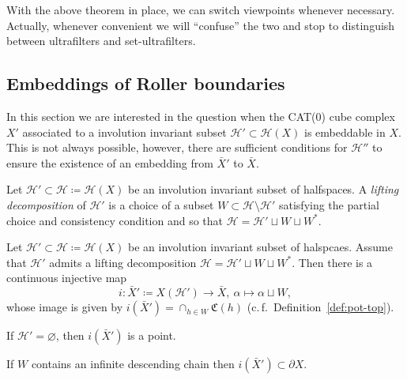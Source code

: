 With the above theorem in place, we can switch viewpoints whenever necessary. Actually, whenever convenient we will \enquote{confuse} the two and stop to distinguish between ultrafilters and set-ultrafilters.

\subsection{Embeddings of Roller boundaries}
\label{sec:embedding-roller}

In this section we are interested in the question when the CAT(0) cube complex \(X'\) associated to a involution invariant subset \(\mathcal{H}' \subset \mathcal{H}(X)\) is embeddable in \(X\). This is not always possible, however, there are sufficient conditions for \(\mathcal{H}''\) to ensure the existence of an embedding from \(\bar X'\) to \(\bar X\).

\begin{defin}
  Let \(\mathcal{H}' \subset \mathcal{H} \coloneqq \mathcal{H}(X)\) be an involution invariant subset of halfspaces. A \emph{lifting decomposition} of \(\mathcal{H}'\) is a choice of a subset \(W \subset \mathcal{H} \setminus \mathcal{H}'\) satisfying the partial choice and consistency condition and so that \(\mathcal{H} = \mathcal{H}' \sqcup W \sqcup W^\ast\).
\end{defin}

\begin{lemma}[{\cite[Lemma~2.6]{MR3509968}}]
  Let \(\mathcal{H}' \subset \mathcal{H} \coloneqq \mathcal{H}(X)\) be an involution invariant subset of halspcaes. Assume that \(\mathcal{H}'\) admits a lifting decomposition \(\mathcal{H} = \mathcal{H}' \sqcup W \sqcup W^\ast\). Then there is a continuous injective map
  \[
    i\colon \bar X' \coloneqq X(\mathcal{H}') \to \bar X,\ \alpha \mapsto \alpha \sqcup W,
  \]
  whose image is given by \(i(\bar X') = \cap_{h \in W} \mathfrak{C}(h)\) (c.\,f.\ Definition~\ref{def:pot-top}).

  If \(\mathcal{H}' = \varnothing\), then \(i(\bar X')\) is a point.

  If \(W\) contains an infinite descending chain then \(i(\bar X') \subset \partial X\).
\end{lemma}

